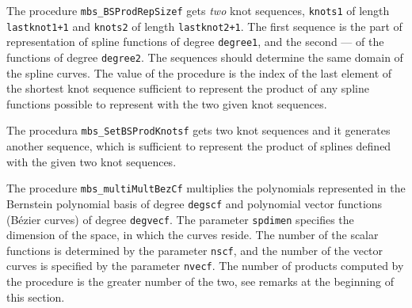 \vspace{\bigskipamount}
The procedure \texttt{mbs\_BSProdRepSizef} gets \emph{two} knot sequences,
\texttt{knots1} of length \texttt{lastknot1+1} and \texttt{knots2}
of length \texttt{lastknot2+1}. The first sequence is the part of representation
of spline functions of degree \texttt{degree1}, and the second --- of the
functions of degree \texttt{degree2}. The sequences should determine the same
domain of the spline curves. The value of the procedure is the index of
the last element of the shortest knot sequence sufficient to represent the
product of any spline functions possible to represent with the two given knot
sequences.

\vspace{\bigskipamount}
The procedura \texttt{mbs\_SetBSProdKnotsf} gets two knot sequences
and it generates another sequence, which is sufficient to represent the
product of splines defined with the given two knot sequences.

\vspace{\bigskipamount}
The procedure \texttt{mbs\_multiMultBezCf} multiplies the polynomials
represented in the Bernstein polynomial basis of degree \texttt{degscf}
and polynomial vector functions (B\'{e}zier curves) of degree
\texttt{degvecf}. The parameter \texttt{spdimen} specifies the dimension of
the space, in which the curves reside. The number of the scalar functions
is determined by the parameter \texttt{nscf}, and the number of the vector
curves is specified by the parameter \texttt{nvecf}. The number of products
computed by the procedure is the greater number of the two, see remarks
at the beginning of this section.

